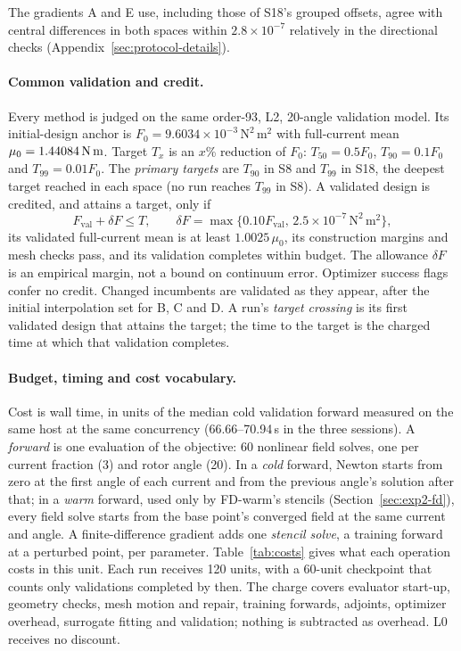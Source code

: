 The gradients A and E use, including those of S18's grouped offsets,
agree with central differences in both spaces within $2.8\times10^{-7}$
relatively in the directional checks (Appendix~\ref{sec:protocol-details}).

\paragraph{Common validation and credit.}
Every method is judged on the same order-93, L2, 20-angle validation model.
Its initial-design anchor is $F_0=9.6034\times10^{-3}\,\mathrm{N^2\,m^2}$ with
full-current mean $\mu_0=1.44084\,\mathrm{N\,m}$. Target $T_x$ is an $x$\% reduction
of $F_0$: $T_{50}=0.5F_0$, $T_{90}=0.1F_0$ and $T_{99}=0.01F_0$. The
\emph{primary targets} are $T_{90}$ in S8 and $T_{99}$ in S18, the deepest
target reached in each space (no run reaches $T_{99}$ in S8). A validated
design is credited, and attains a target, only if
\begin{equation}
 F_{\mathrm{val}}+\delta F\leq T,\qquad
 \delta F=\max\{0.10F_{\mathrm{val}},\,2.5\times10^{-7}\,\mathrm{N^2\,m^2}\},
\end{equation}
its validated full-current mean is at least $1.0025\,\mu_0$, its
construction margins and mesh checks pass, and its validation completes
within budget. The allowance $\delta F$ is an empirical margin, not a bound
on continuum error. Optimizer success flags confer no credit. Changed
incumbents are validated as they appear, after the initial interpolation
set for B, C and D. A run's \emph{target crossing} is its first validated
design that attains the target; the time to the target is the charged time
at which that validation completes.

\paragraph{Budget, timing and cost vocabulary.}
Cost is wall time, in units of the median cold validation forward measured
on the same host at the same concurrency (66.66--70.94\,s in the three
sessions). A \emph{forward} is one evaluation of the objective: 60
nonlinear field solves, one per current fraction (3) and rotor angle (20).
In a \emph{cold} forward, Newton starts from zero at the first angle of each
current and from the previous angle's solution after that; in a
\emph{warm} forward, used only by FD-warm's stencils
(Section~\ref{sec:exp2-fd}), every field solve starts from the base
point's converged field at the same current and angle. A
finite-difference gradient adds one \emph{stencil solve}, a training
forward at a perturbed point, per parameter. Table~\ref{tab:costs} gives
what each operation costs in this unit. Each run receives 120 units,
with a 60-unit checkpoint that counts only validations completed by then.
The charge covers evaluator start-up, geometry checks, mesh motion and
repair, training forwards, adjoints, optimizer overhead, surrogate fitting
and validation; nothing is subtracted as overhead. L0 receives no discount.

